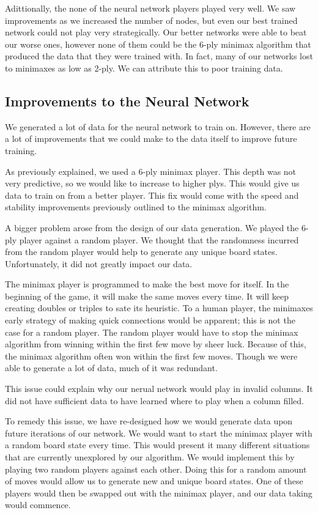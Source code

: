 \documentclass[12pt]{article}
\begin{document}
Adittionally, the none of the neural network players played very well. We saw improvements as we increased the number of nodes, but even our best trained network could not play very strategically. Our better networks were able to beat our worse ones, however none of them could be the 6-ply minimax algorithm that produced the data that they were trained with. In fact, many of our networks lost to minimaxes as low as 2-ply. We can attribute this to poor training data.


\subsection{Improvements to the Neural Network}
We generated a lot of data for the neural network to train on. However, there are a lot of improvements that we could make to the data itself to improve future training.

As previously explained, we used a 6-ply minimax player. This depth was not very predictive, so we would like to increase to higher plys. This would give us data to train on from a better player. This fix would come with the speed and stability improvements previously outlined to the minimax algorithm.

A bigger problem arose from the design of our data generation. We played the 6-ply player against a random player. We thought that the randomness incurred from the random player would help to generate any unique board states. Unfortunately, it did not greatly impact our data.

The minimax player is programmed to make the best move for itself. In the beginning of the game, it will make the same moves every time. It will keep creating doubles or triples to sate its heuristic. To a human player, the minimaxes early strategy of making quick connections would be apparent; this is not the case for a random player. The random player would have to stop the minimax algorithm from winning within the first few move by sheer luck. Because of this, the minimax algorithm often won within the first few moves. Though we were able to generate a lot of data, much of it was redundant.

This issue could explain why our nerual network would play in invalid columns. It did not have sufficient data to have learned where to play when a column filled.

To remedy this issue, we have re-designed how we would generate data upon future iterations of our network. We would want to start the minimax player with a random board state every time. This would present it many different situations that are currently unexplored by our algorithm. We would implement this by playing two random players against each other. Doing this for a random amount of moves would allow us to generate new and unique board states. One of these players would then be swapped out with the minimax player, and our data taking would commence. 
\end{document}
